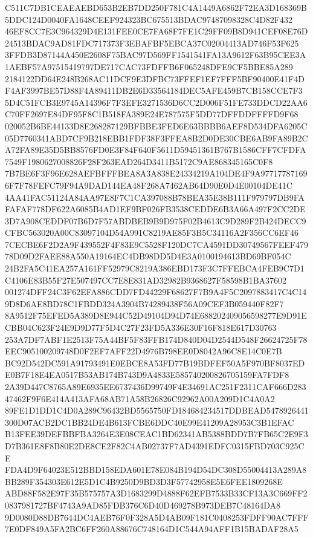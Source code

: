 \documentclass[UTF8,fontset=fandol,zihao=-4,a4paper]{ctexart}
\begin{document}
{{C511C7DB1CEAEAEBD653B2EB7DD250F781C4A1449A6862F72EA3D168369B5DDC124D0040FA1648CEEF924323BC675513BDAC97487098328C4D82F432
46EF8CC7E3C964329D4E131FEE0CE7FA68F7FE1C29FF09B8D941CEF08E76D24513BDAC9AD81FDC717373F3EBAFBF5EBCA37C02004413AD746F53F625
3FFDB3D87144A450E2608F75BAC97D569FF1541541FA13A9612F63B95CEE3A1AEBF57A97515419797DE717CAC73FDFFB6F065248DFE9CF5BBE85A289
2184122DD64E248B268AC11DCF9E3DFBC73FFEF1EF7FFF5BF90400E41F4DF4AF3997BE57D88F4A89411DB2E6D33564184DEC5AFE459B7CB158CCE7F3
5D4C51FCB3E9745A14396F7F3EFE3271536D6CC2D006F51FE733DDCD22AA6C70FF2697E84DF95F8C1B518FA389E24E787575F5DD77DFFDDFFFFD9F68
020052B6BE44133D8E268287129BFBBE3FED6E63BBBB6AEF8D534DFA6205C05D7760341ABD7CF9B218EBB1FDF38F3FFEA8B2D0DE30CBE6AB9FA89B2C
A72FA89E35D5BB8576FD0E3F84F640F5611D59451361B767B1586CFF7CFDFA7549F1980627008826F28F263EAD264D3411B5172C9AE868345165C0F8
7B7BE6F3F96E628AEFBFFFBEA8A3A838E24334219A104DE4F9A977177871696F7F78FEFC79F94A9DAD144EA48F268A7462AB64D90E0D4E00104DE41C
4AA41FAC51124A84AA97E8F7C1CA397088B78BEA35E38B111F979797DB9FAFAFAF778DF622A6085B4AD1EF9BF026FB3538CEDDE6B3A66A497F2CC2DE
3D7A908CEDDF07B6D7F57ABDBEB9B9D975F02B4613C9D289F2B424DECC9CFBC563020A00C83097104D54A991C8219AE85F3B5C34116A2F356CC6EF46
7CECBE6F2D2A9F439552F4F83E9C5528F120DC7CA4591DD30749567FEEF47978D09D2FAEE88A550A19164EC4DB98DD5D4E3A0100194613BD69BF054C
24B2FA5C41EA257A161FF52979C8219A386EBD173F3C7FFEBCA4FEB9C7D1C4106E83B55F27E507497CC7E8E831AD32982B9368627F58598B1BA37602
001274DFF24C3F62EFA886CDD7FD44229F68627F7B9A4F5C2097883417C4C149D8D6AE8BD78C1FBDD324A3904B74289438F56A09CEF3B059440F82F7
8A9512F75EFED5A389D8E944C52D49104D94D74E688202409056598277E9D91ECBB04C623F24E9D9D77F5D4C27F23FD5A336E30F16F818E617D30763
253A7DF7ABF1E2513F75A44BF5F83FFB174D840D04D2544D548F26624725F78EEC905100209748D0F2EF7AFF22D4976B798EE0D8042A96C8E14C0E7B
BC92D542DC591A91793491E0EBCE8A53FD77B19BDFEF50A5F970BF8037EDE0B7F18E4EA0517B53AB174B743D9A4833E585740200826705159FA7FDF8
2A39D447C8765A89E6935EE6737436D99749F4E34691AC251F2311CAF666D28347462F9F6E414A413AFA68AB71A58B26826C92962A00A209D1C4A0A2
89FE1D1DD1C4D0A289C96432BD5565750FD184684234517DDBEAD5478926441300D07ACB2DC1BB24DE4B613FCBE6DDC40E99E41209A28953C3B1EFAC
B13FEE39DEFBBFBA3264E3E08CEAC1BD62341AB5388BDD7B7FB65C2E9F3D7B361E8F8B80E2DE8CE2F82C4AB02737F7AD4391EDFC0315FBD703C925CE
FDA4D9F64023E512BBD158EDA601E78E084B194D54DC308D55004413A289A8BB289F354303E612E5D1C4B9250D9BD3D3F57742958E5E6FEE1809268E
ABD88F582E97F35B575757A3D1683299D4888F62EFB7533B33CF13A3C669FF20837981727BF4743A9AD85FDB376C6D40D469278B973DEB7C48164DA8
9D0080D88DB7644DC4AEB76F0F328A5D4AB09F181C0408253FDFF90AC7FFF7E0DF849A5FA2BC6FF260A88676C748164D1C544A94AFF1B15BADAF28A5
}}
\end{document}
